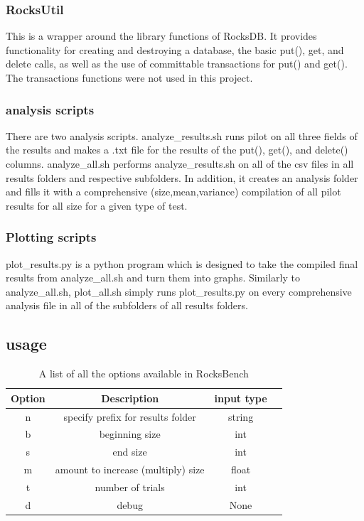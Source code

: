 \documentclass[twocolumn,11pt]{article}
\begin{document}
\subsubsection{RocksUtil}

This is a wrapper around the library functions of RocksDB. It provides
functionality for creating and destroying a database, the basic put(), get, and
delete calls, as well as the use of committable transactions for put() and
get(). The transactions functions were not used in this project.

\subsubsection{analysis scripts}

There are two analysis scripts. analyze\_results.sh runs pilot on all three
fields of the results and makes a .txt file for the results of the put(), get(),
and delete() columns. analyze\_all.sh performs analyze\_results.sh on all of the
csv files in all results folders and respective subfolders. In addition, it
creates an analysis folder and fills it with a comprehensive
(size,mean,variance) compilation of all pilot results for all size for a given
type of test.

\subsubsection{Plotting scripts}

plot\_results.py is a python program which is designed to take the compiled
final results from analyze\_all.sh and turn them into graphs. Similarly to
analyze\_all.sh, plot\_all.sh simply runs plot\_results.py on every
comprehensive analysis file in all of the subfolders of all results folders.

\subsection{usage}

\begin{table}[h!]
  \begin{tabular}{ |c|c|c|c| }
    \hline
    Option & Description & input type \\
    \hline \hline
    n & specify prefix for results folder & string \\ \hline
    b & beginning size & int \\ \hline
    s & end size & int \\ \hline
    m & amount to increase (multiply) size & float \\ \hline
    t & number of trials & int \\ \hline
    d & debug & None \\ \hline
  \end{tabular}
  \caption{A list of all the options available in RocksBench}
  \label{tab:RocksBench_options}
\end{table}
\end{document}

